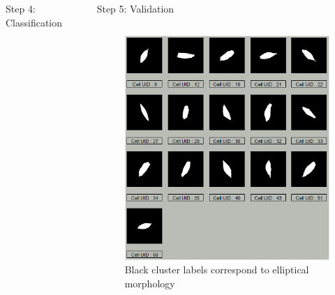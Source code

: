 \documentclass[final,hyperref={pdfpagelabels=false}]{beamer}
\begin{document}
\begin{frame}[t]
\begin{columns}[t]
\begin{column}{.33\textwidth}
\begin{block}{Step 4: Classification}
\end{block}

\end{column}

\begin{column}{.01\textwidth}\end{column} 

\begin{column}{.31\textwidth} 

\begin{block}{Step 5: Validation}

\vspace{0.5em}

\begin{columns}

\begin{column}{.48\textwidth}
\centering
\begin{figure}
\includegraphics[width=0.99\linewidth]{cluster_fig1.png}
\captionsetup{justification=raggedright,singlelinecheck=false,labelformat=empty}
\caption{Black cluster labels correspond to elliptical morphology}
\end{figure}
\end{column}


\end{columns}
\end{block}
\end{column}
\end{columns}
\end{frame}
\end{document}
